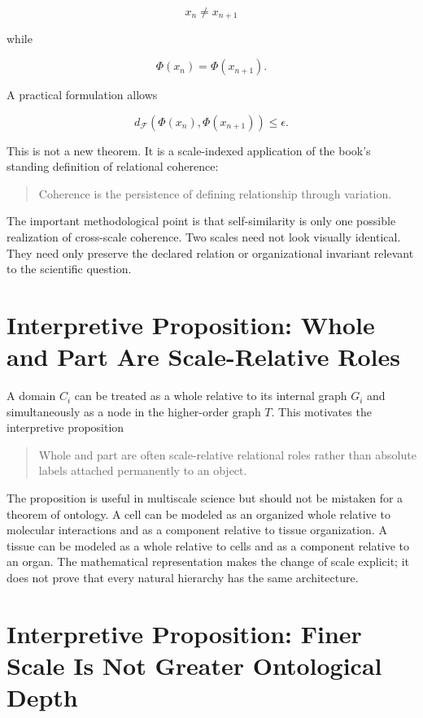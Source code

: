 \[
x_n\neq x_{n+1}
\]

while

\[
\Phi(x_n)=\Phi(x_{n+1}).
\]

A practical formulation allows

\[
d_{\mathcal F}(\Phi(x_n),\Phi(x_{n+1}))\le\epsilon.
\]

This is not a new theorem. It is a scale-indexed application of the book's standing definition of relational coherence:

\begin{quote}
Coherence is the persistence of defining relationship through variation.
\end{quote}

The important methodological point is that self-similarity is only one possible realization of cross-scale coherence. Two scales need not look visually identical. They need only preserve the declared relation or organizational invariant relevant to the scientific question.

\section{Interpretive Proposition: Whole and Part Are Scale-Relative Roles}

A domain $C_i$ can be treated as a whole relative to its internal graph $G_i$ and simultaneously as a node in the higher-order graph $T$. This motivates the interpretive proposition

\begin{quote}
Whole and part are often scale-relative relational roles rather than absolute labels attached permanently to an object.
\end{quote}

The proposition is useful in multiscale science but should not be mistaken for a theorem of ontology. A cell can be modeled as an organized whole relative to molecular interactions and as a component relative to tissue organization. A tissue can be modeled as a whole relative to cells and as a component relative to an organ. The mathematical representation makes the change of scale explicit; it does not prove that every natural hierarchy has the same architecture.

\section{Interpretive Proposition: Finer Scale Is Not Greater Ontological Depth}

